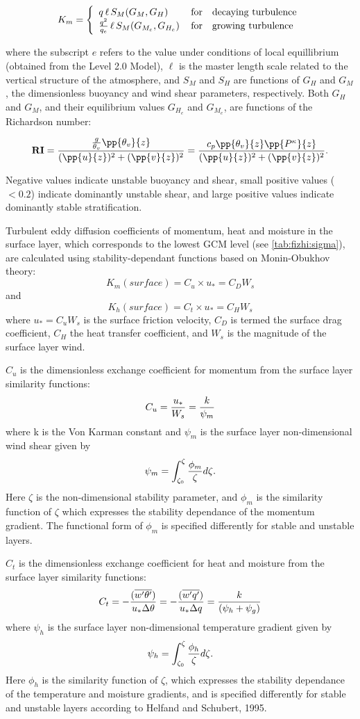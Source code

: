 \[
K_m
 = \left\{ \begin{array}{l@{\quad\mbox{for}\quad}l} q \, \ell \, S_M(G_M,G_H) \, & \mbox{decaying turbulence}                
\\ { q^2 \over {q_e} } \, \ell \, S_{M}(G_{M_e},G_{H_e}) \, & \mbox{growing turbulence} \end{array} \right.
\]

where the subscript $e$ refers to the value under conditions of local equillibrium
(obtained from the Level 2.0 Model), $\ell$ is the master length scale related to the 
vertical structure of the atmosphere,
and $S_M$ and $S_H$ are functions of $G_H$ and $G_M$, the dimensionless buoyancy and
wind shear parameters, respectively.
Both $G_H$ and $G_M$, and their equilibrium values $G_{H_e}$ and $G_{M_e}$,
are functions of the Richardson number:

\[
{\bf RI} = { { {g \over \theta_v} \pp {\theta_v}{z} } \over { (\pp{u}{z})^2 + (\pp{v}{z})^2 } }
 =  {  {c_p \pp{\theta_v}{z} \pp{P^ \kappa}{z} } \over { (\pp{u}{z})^2 + (\pp{v}{z})^2 } } .
\]

Negative values indicate unstable buoyancy and shear, small positive values ($<0.2$)
indicate dominantly unstable shear, and large positive values indicate dominantly stable
stratification.

Turbulent eddy diffusion coefficients of momentum, heat and moisture in the surface layer,
which corresponds to the lowest GCM level (see \ref{tab:fizhi:sigma}),
are calculated using stability-dependant functions based on Monin-Obukhov theory:
\[
{K_m} (surface) = C_u \times u_* = C_D W_s
\]
and
\[
{K_h} (surface) =  C_t \times u_* = C_H W_s
\]
where $u_*=C_uW_s$ is the surface friction velocity,
$C_D$ is termed the surface drag coefficient, $C_H$ the heat transfer coefficient, 
and $W_s$ is the magnitude of the surface layer wind.

$C_u$ is the dimensionless exchange coefficient for momentum from the surface layer
similarity functions: 
\[
{C_u} = {u_* \over W_s} = { k \over \psi_{m} }
\]
where k is the Von Karman constant and $\psi_m$ is the surface layer non-dimensional 
wind shear given by
\[
\psi_{m} = {\int_{\zeta_{0}}^{\zeta} {\phi_{m} \over \zeta} d \zeta} .
\]
Here $\zeta$ is the non-dimensional stability parameter, and
$\phi_m$ is the similarity function of $\zeta$ which expresses the stability dependance of
the momentum gradient.  The functional form of $\phi_m$ is specified differently for stable and unstable 
layers.

$C_t$ is the dimensionless exchange coefficient for heat and 
moisture from the surface layer similarity functions:
\[
{C_t} = -{( {\overline{w^{\prime}\theta^{\prime}}}) \over {u_* \Delta \theta }} =
-{( {\overline{w^{\prime}q^{\prime}}}) \over {u_* \Delta q }} =
{ k \over { (\psi_{h} + \psi_{g}) } }
\]
where $\psi_h$ is the surface layer non-dimensional temperature gradient given by
\[
\psi_{h} = {\int_{\zeta_{0}}^{\zeta} {\phi_{h} \over \zeta} d \zeta} .
\]
Here $\phi_h$ is the similarity function of $\zeta$, which expresses the stability dependance of
the temperature and moisture gradients, and is specified differently for stable and unstable
layers according to Helfand and Schubert, 1995.

